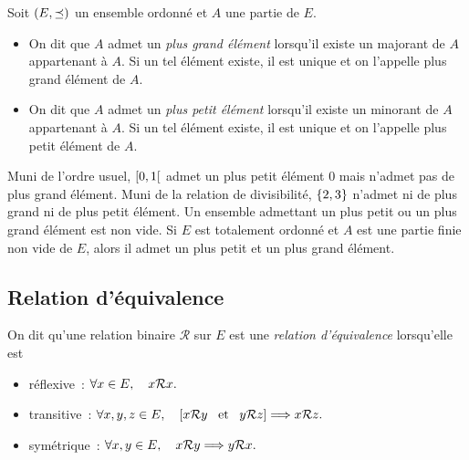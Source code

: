 \documentclass{magnoliaold}
\begin{document}

\begin{definition}[utile=-3]
Soit $\left(E,\preceq\right)$ un ensemble ordonné et $A$ une partie de $E$.
\begin{itemize}
\item On dit que $A$ admet un \emph{plus grand élément} lorsqu'il existe un majorant
  de $A$ appartenant à $A$. Si un tel élément existe, il est unique et on
  l'appelle plus grand élément de $A$.
\item On dit que $A$ admet un \emph{plus petit élément} lorsqu'il existe un minorant
  de $A$ appartenant à $A$. Si un tel élément existe, il est unique et on
  l'appelle plus petit élément de $A$.
\end{itemize}
\end{definition}

\begin{remarques}
\remarque Muni de l'ordre usuel, $\left[0,1\right[$ admet un plus petit élément 0
  mais n'admet pas de plus grand élément. Muni de la relation de divisibilité,
  $\left\{2,3\right\}$ n'admet ni de plus grand ni de plus petit élément.
\remarque Un ensemble admettant un plus petit ou un plus grand élément est non
   vide.
\remarque Si $E$ est totalement ordonné et $A$ est une partie finie non vide de
  $E$, alors il admet un plus petit et un plus grand élément.
\end{remarques}

\subsection{Relation d'équivalence}

\begin{definition}[utile=-3]
On dit qu'une relation binaire $\mathcal{R}$ sur $E$ est une
\emph{relation d'équivalence} lorsqu'elle est
\begin{itemize}
\item réflexive~: $\forall x\in E ,\quad x\mathcal{R} x.$
\item transitive~: $\forall x,y,z\in E ,\quad \left[x\mathcal{R} y \quad\!\text{et}\quad\!
  y\mathcal{R} z\right] \Longrightarrow x\mathcal{R} z.$
\item symétrique~: $\forall x,y\in E ,\quad x\mathcal{R} y \Longrightarrow
  y\mathcal{R} x.$
\end{itemize}
\end{definition}
\end{document}
